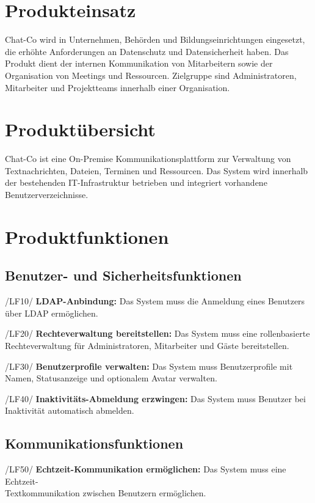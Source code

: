\documentclass[12pt,a4paper]{extarticle}
\begin{document}
\vspace{1cm}
\section{Produkteinsatz}

Chat-Co wird in Unternehmen, Behörden und Bildungseinrichtungen eingesetzt, die erhöhte Anforderungen an Datenschutz und Datensicherheit haben. Das Produkt dient der internen Kommunikation von Mitarbeitern sowie der Organisation von Meetings und Ressourcen. Zielgruppe sind Administratoren, Mitarbeiter und Projektteams innerhalb einer Organisation.

\newpage
\section{Produktübersicht}

Chat-Co ist eine On-Premise Kommunikationsplattform zur Verwaltung von Textnachrichten, Dateien, Terminen und Ressourcen.
Das System wird innerhalb der bestehenden IT-Infrastruktur betrieben und integriert vorhandene Benutzerverzeichnisse.

\section{Produktfunktionen}

\subsection{Benutzer- und Sicherheitsfunktionen}

/LF10/ \textbf{LDAP-Anbindung:} Das System muss die Anmeldung eines Benutzers über LDAP ermöglichen.

/LF20/ \textbf{Rechteverwaltung bereitstellen:} Das System muss eine rollenbasierte Rechteverwaltung für Administratoren, Mitarbeiter und Gäste bereitstellen.

/LF30/ \textbf{Benutzerprofile verwalten:} Das System muss Benutzerprofile mit Namen, Statusanzeige und optionalem Avatar verwalten.

/LF40/ \textbf{Inaktivitäts-Abmeldung erzwingen:} Das System muss Benutzer bei Inaktivität automatisch abmelden.

\subsection{Kommunikationsfunktionen}

/LF50/ \textbf{Echtzeit-Kommunikation ermöglichen:} Das System muss eine Echtzeit-\\Textkommunikation zwischen Benutzern ermöglichen.
\end{document}
